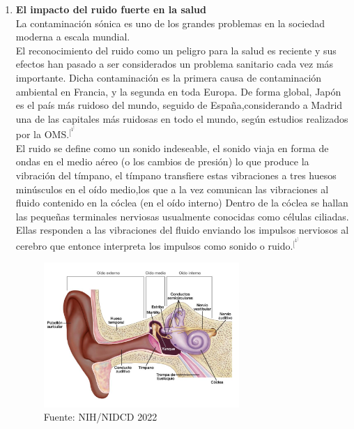 {{\begin{enumerate}[label=\textbf{1.\arabic*}]
\item \textbf{El impacto del ruido fuerte en la salud}\\ 
                    
 La contaminación sónica es uno de los grandes problemas en la sociedad moderna a escala mundial.\\
            
 El reconocimiento del ruido como un peligro para la salud es reciente y sus efectos han pasado a ser considerados un problema sanitario cada vez más importante. Dicha contaminación es la primera causa de contaminación ambiental en Francia, y la segunda en toda Europa. De forma global, Japón es el país más ruidoso del mundo, seguido de España,considerando a Madrid una de las capitales más ruidosas en todo el mundo, según estudios realizados por la OMS.$^[^1^]$ \\
        
El ruido se define como un sonido indeseable, el sonido viaja en forma de ondas en el medio aéreo (o los cambios de presión) lo que produce la vibración del tímpano, el tímpano transfiere estas vibraciones a tres huesos minúsculos en el oído medio,los que a la vez comunican las vibraciones al fluido contenido en la cóclea (en el oído interno) Dentro de la cóclea se hallan las pequeñas terminales nerviosas usualmente conocidas como células ciliadas. Ellas responden a las vibraciones del fluido enviando los impulsos nerviosos al cerebro que entonce interpreta los impulsos como sonido o ruido.$^[^1^]$ \\

            \begin{figure}[h]
              \centering
              \includegraphics[width=0.7\textwidth]{img/Oido.jpg}
              \caption{Fuente: NIH/NIDCD 2022}
              \label{fig:your_label}
            \end{figure} 
        

\end{enumerate}}}
